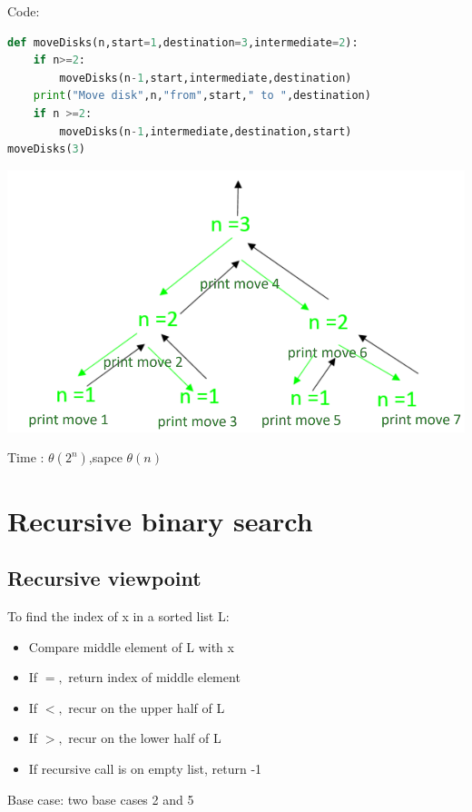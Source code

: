 \documentclass[12pt,oneside]{book}
\begin{document}
\begin{minipage}{0.6\linewidth}
	Code:
	\begin{lstlisting}[language=python]
def moveDisks(n,start=1,destination=3,intermediate=2):
    if n>=2:
        moveDisks(n-1,start,intermediate,destination)
    print("Move disk",n,"from",start," to ",destination)
    if n >=2:
        moveDisks(n-1,intermediate,destination,start)
moveDisks(3)
\end{lstlisting}
\end{minipage}
\begin{minipage}{0.4\linewidth}
	\includegraphics[width=\linewidth]{../pic/python/13}
\end{minipage}
Time : $\theta(2^n)$,sapce $\theta(n)$
\section{Recursive binary search}
\subsection{Recursive viewpoint}
To find the index of x in a sorted list L:
\begin{itemize}
	\item Compare middle element of L with x
	\item If $=,$ return index of middle element
	\item If $<,$ recur on the upper half of L
	\item If $>,$ recur on the lower half of L
	\item If recursive call is on empty list, return -1
\end{itemize}
Base case: two base cases 2 and 5
\end{document}
